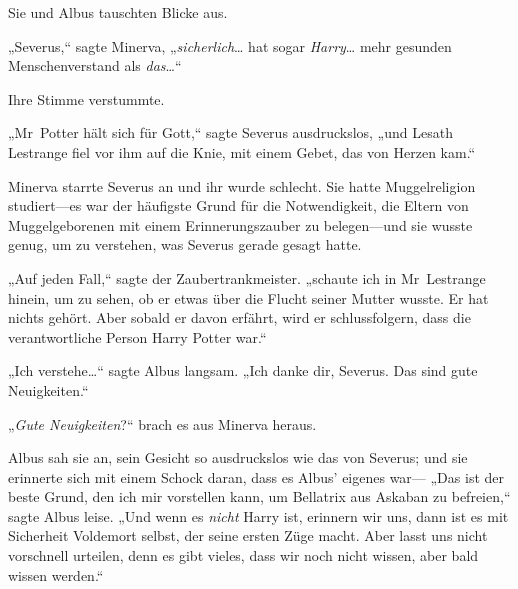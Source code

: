 Sie und Albus tauschten Blicke aus.

„Severus,“ sagte Minerva, „\emph{sicherlich}… hat sogar \emph{Harry}… mehr gesunden Menschenverstand als \emph{das}…“

Ihre Stimme verstummte.

„Mr~Potter hält sich für Gott,“ sagte Severus ausdruckslos, „und Lesath Lestrange fiel vor ihm auf die Knie, mit einem Gebet, das von Herzen kam.“

Minerva starrte Severus an und ihr wurde schlecht. Sie hatte Muggelreligion studiert—es war der häufigste Grund für die Notwendigkeit, die Eltern von Muggelgeborenen mit einem Erinnerungszauber zu belegen—und sie wusste genug, um zu verstehen, was Severus gerade gesagt hatte.

„Auf jeden Fall,“ sagte der Zaubertrankmeister. „schaute ich in Mr~Lestrange hinein, um zu sehen, ob er etwas über die Flucht seiner Mutter wusste. Er hat nichts gehört. Aber sobald er davon erfährt, wird er schlussfolgern, dass die verantwortliche Person Harry Potter war.“

„Ich verstehe…“ sagte Albus langsam. „Ich danke dir, Severus. Das sind gute Neuigkeiten.“

„\emph{Gute Neuigkeiten}?“ brach es aus Minerva heraus.

Albus sah sie an, sein Gesicht so ausdruckslos wie das von Severus; und sie erinnerte sich mit einem Schock daran, dass es Albus' eigenes war— „Das ist der beste Grund, den ich mir vorstellen kann, um Bellatrix aus Askaban zu befreien,“ sagte Albus leise. „Und wenn es \emph{nicht} Harry ist, erinnern wir uns, dann ist es mit Sicherheit Voldemort selbst, der seine ersten Züge macht. Aber lasst uns nicht vorschnell urteilen, denn es gibt vieles, dass wir noch nicht wissen, aber bald wissen werden.“


